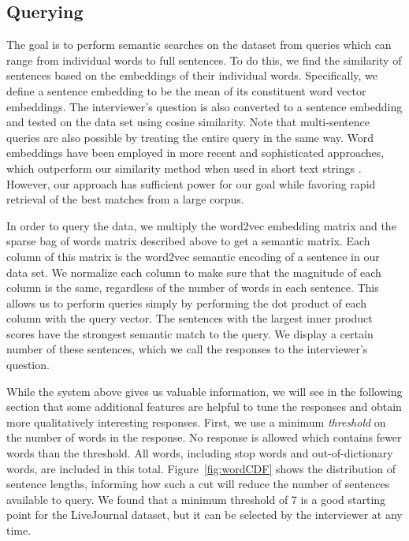 \documentclass{sigchi}
\begin{document}
\subsection{Querying}

The goal is to perform semantic searches on the dataset from queries which can range from individual words to full sentences. To do this, we find the similarity of sentences based on the embeddings of their individual words. Specifically, we define a sentence embedding to be the mean of its constituent word vector embeddings. The interviewer's question is also converted to a sentence embedding and tested on the data set using cosine similarity. Note that multi-sentence queries are also possible by treating the entire query in the same way. Word embeddings have been employed in more recent and sophisticated approaches, which outperform our similarity method when used in short text strings \cite{kenter15short}. However, our approach has sufficient power for our goal while favoring rapid retrieval of the best matches from a large corpus. 

In order to query the data, we multiply the word2vec embedding matrix and the sparse bag of words matrix described above to get a semantic matrix. Each column of this matrix is the word2vec semantic encoding of a sentence in our data set. We normalize each column to make sure that the magnitude of each column is the same, regardless of the number of words in each sentence. This allows us to perform queries simply by performing the dot product of each column with the query vector. The sentences with the largest inner product scores have the strongest semantic match to the query. We display a certain number of these sentences, which we call the responses to the interviewer's question.

While the system above gives us valuable information, we will see in the following section that some additional features are helpful to tune the responses and obtain more qualitatively interesting responses. First, we use a minimum {\em threshold} on the number of words in the response. No response is allowed which contains fewer words than the threshold. All words, including stop words and out-of-dictionary words, are included in this total. Figure~\ref{fig:wordCDF} shows the distribution of sentence lengths, informing how such a cut will reduce the number of sentences available to query. We found that a minimum threshold of 7 is a good starting point for the LiveJournal dataset, but it can be selected by the interviewer at any time.
\end{document}
